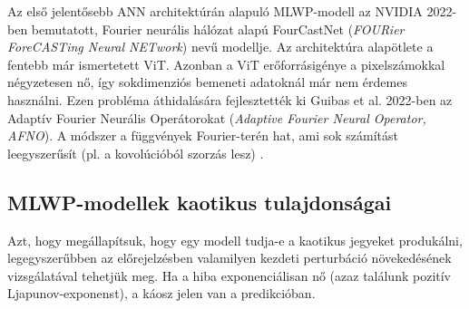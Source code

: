 \documentclass[12pt,a4paper]{article}
\begin{document}
Az első jelentősebb ANN architektúrán alapuló MLWP-modell az NVIDIA 2022-ben bemutatott, Fourier neurális hálózat alapú FourCastNet (\textit{FOURier ForeCASTing Neural NETwork}) nevű modellje. Az architektúra alapötlete a fentebb már ismertetett ViT. Azonban a ViT erőforrásigénye a pixelszámokkal négyzetesen nő, így sokdimenziós bemeneti adatoknál már nem érdemes használni. Ezen probléma áthidalására fejlesztették ki Guibas et al. 2022-ben az Adaptív Fourier Neurális Operátorokat (\textit{Adaptive Fourier Neural Operator, AFNO}). A módszer a függvények Fourier-terén hat, ami sok számítást leegyszerűsít (pl. a kovolúcióból szorzás lesz) \cite{guibas_adaptive_2022}.  



\subsection{MLWP-modellek kaotikus tulajdonságai}
Azt, hogy megállapítsuk, hogy egy modell tudja-e a kaotikus jegyeket produkálni, legegyszerűbben az előrejelzésben valamilyen kezdeti perturbáció növekedésének vizsgálatával tehetjük meg. Ha a hiba exponenciálisan nő (azaz találunk pozitív Ljapunov-exponenst), a káosz jelen van a predikcióban.







\end{document}
